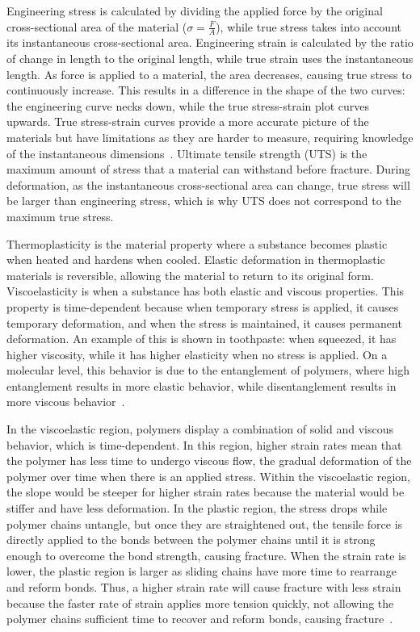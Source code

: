 \documentclass[11pt]{article}
\begin{document}
    Engineering stress is calculated by dividing the applied force by the original cross-sectional area of the material (\(\sigma = \frac{F}{A}\)), while true stress takes into account its instantaneous cross-sectional area. 
    Engineering strain is calculated by the ratio of change in length to the original length, while true strain uses the instantaneous length. 
    As force is applied to a material, the area decreases, causing true stress to continuously increase. 
    This results in a difference in the shape of the two curves: the engineering curve necks down, while the true stress-strain plot curves upwards. 
    True stress-strain curves provide a more accurate picture of the materials but have limitations as they are harder to measure, requiring knowledge of the instantaneous dimensions~\cite{Hibbeler2022}. 
    Ultimate tensile strength (UTS) is the maximum amount of stress that a material can withstand before fracture. 
    During deformation, as the instantaneous cross-sectional area can change, true stress will be larger than engineering stress, which is why UTS does not correspond to the maximum true stress.
    
    Thermoplasticity is the material property where a substance becomes plastic when heated and hardens when cooled. 
    Elastic deformation in thermoplastic materials is reversible, allowing the material to return to its original form. 
    Viscoelasticity is when a substance has both elastic and viscous properties. 
    This property is time-dependent because when temporary stress is applied, it causes temporary deformation, and when the stress is maintained, it causes permanent deformation. 
    An example of this is shown in toothpaste: when squeezed, it has higher viscosity, while it has higher elasticity when no stress is applied. 
    On a molecular level, this behavior is due to the entanglement of polymers, where high entanglement results in more elastic behavior, while disentanglement results in more viscous behavior~\cite{Kazmer2014}.
    
    In the viscoelastic region, polymers display a combination of solid and viscous behavior, which is time-dependent. 
    In this region, higher strain rates mean that the polymer has less time to undergo viscous flow, the gradual deformation of the polymer over time when there is an applied stress. 
    Within the viscoelastic region, the slope would be steeper for higher strain rates because the material would be stiffer and have less deformation. 
    In the plastic region, the stress drops while polymer chains untangle, but once they are straightened out, the tensile force is directly applied to the bonds between the polymer chains until it is strong enough to overcome the bond strength, causing fracture. 
    When the strain rate is lower, the plastic region is larger as sliding chains have more time to rearrange and reform bonds. 
    Thus, a higher strain rate will cause fracture with less strain because the faster rate of strain applies more tension quickly, not allowing the polymer chains sufficient time to recover and reform bonds, causing fracture~\cite{Poapongsakorn2011}.
    
\end{document}
